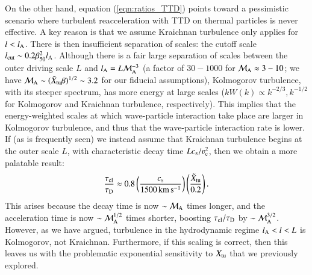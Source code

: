 \documentclass[fleqn,usenatbib,useAMS]{mnras}
\begin{document}
On the other hand, equation (\ref{eqn:ratios_TTD}) points toward a pessimistic scenario where turbulent reacceleration with TTD on thermal particles is never effective. A key reason is that we assume Kraichnan turbulence only applies for $l< l_{\rm A}$. There is then insufficient separation of scales: the cutoff scale $l_{\rm cut} \sim 0.2 \beta_{\rm 50}^{2} l_{\rm A}$. Although there is a fair large separation of scales between the outer driving scale $L$ and $l_{\rm A} = L \mathcal{M}_{\rm A}^{-3}$ (a factor of $30-1000$ for $\mathcal{M}_{\rm A} \approx 3-10$; we have $\mathcal{M}_{\rm A} \sim (\tilde{X}_{\rm tu} \beta)^{1/2} \sim 3.2$ for our fiducial assumptions), Kolmogorov turbulence, with its steeper spectrum, has more energy at large scales ($k W(k) \propto k^{-2/3}, k^{-1/2}$ for Kolmogorov and Kraichnan turbulence, respectively). This implies that the energy-weighted scales at which wave-particle interaction take place are larger in Kolmogorov turbulence, and thus that the wave-particle interaction rate is lower. If (as is frequently seen) we instead assume that Kraichnan turbulence begins at the outer scale $L$, with characteristic decay time $L c_{\rm s}/\varv_{\rm c}^{2}$, then we obtain a more palatable result: 
\begin{equation}
\frac{\tau_{\rm cl}}{\tau_{\rm D}} \approx 0.8  \left( \frac{c_{\rm s}}{1500 \, {\rm km \, s^{-1}}} \right) \left( \frac{\tilde{X}_{\rm tu}}{0.2} \right). 
\end{equation}
This arises because the decay time is now $\sim \mathcal{M}_{\rm A}$ times longer, and the acceleration time is now $\sim \mathcal{M}_{\rm A}^{1/2}$ times shorter, boosting $\tau_{\rm cl}/\tau_{\rm D}$ by $\sim \mathcal{M}_{\rm A}^{3/2}$. However, as we have argued, turbulence in the hydrodynamic regime $l_{\rm A} < l < L$ is Kolmogorov, not Kraichnan. Furthermore, if this scaling is correct, then this leaves us with the problematic exponential sensitivity to $X_{\rm tu}$ that we previously explored. 
\end{document}
